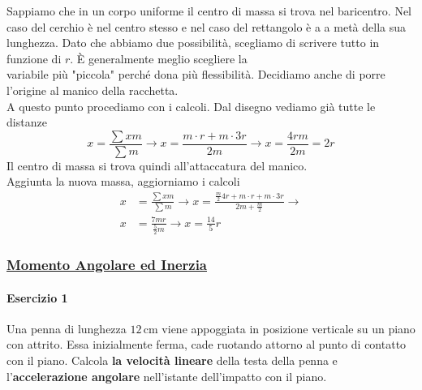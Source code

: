 Sappiamo che in un corpo uniforme il centro di massa si trova nel baricentro. Nel caso del cerchio è
nel centro stesso e nel caso del rettangolo è a a metà della sua lunghezza. Dato che abbiamo due 
possibilità, scegliamo di scrivere tutto in funzione di $r$. È generalmente meglio scegliere la \\
variabile più "piccola" perché dona più flessibilità. Decidiamo anche di porre l'origine al manico 
della racchetta.\\
A questo punto procediamo con i calcoli. Dal disegno vediamo già tutte le distanze
\begin{equation*}
x = \frac{\sum xm}{\sum m} \rightarrow x = \frac{m\cdot r + m\cdot 3r}{2m} \rightarrow
x = \frac{4rm}{2m} = \boxed{2r}
\end{equation*}
Il centro di massa si trova quindi all'attaccatura del manico.\\
Aggiunta la nuova massa, aggiorniamo i calcoli
\begin{align*}
x &= \frac{\sum xm}{\sum m} \rightarrow 
x=\frac{\frac{m}{2}4r + m\cdot r + m\cdot 3r}{2m+\frac{m}{2}}\rightarrow\\
x &= \frac{7mr}{\frac{5}{2}m} \rightarrow x = \boxed{\frac{14}{5}r}
\end{align*}

\subsubsection*{\hyperref[subsec:dinamica:inerzia]{Momento Angolare ed Inerzia}}\label{ex:inerzia}
\paragraph{Esercizio 1}
Una penna di lunghezza $12\,\text{cm}$ viene appoggiata in posizione verticale su un piano con 
attrito. Essa inizialmente ferma, cade ruotando attorno al punto di contatto con il piano. Calcola
\textbf{la velocità lineare} della testa della penna e l'\textbf{accelerazione angolare} nell'istante 
dell'impatto con il piano.
\divisor

